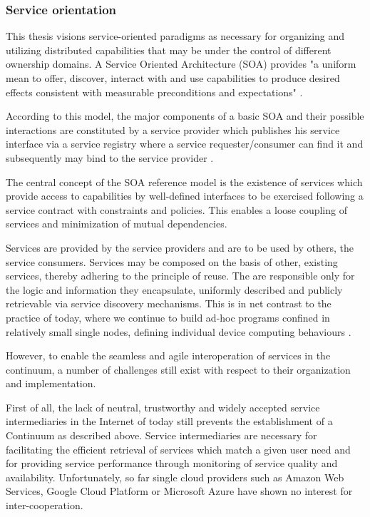 \documentclass{ieeeaccess}
\begin{document}
\subsubsection{Service orientation}

This thesis visions service-oriented paradigms as necessary for organizing and utilizing distributed capabilities that may be under the control of different ownership domains. A Service Oriented Architecture (SOA) provides "a uniform mean to offer, discover, interact with and use capabilities to produce desired effects consistent with measurable preconditions and expectations" \cite{oasis}.

According to this model, the major components of a basic SOA and their possible interactions are constituted by a service provider which publishes his service interface via a service registry where a service requester/consumer can find it and subsequently may bind to the service provider \cite{iot-enterprise}.

The central concept of the SOA reference model is the existence of services which provide access to capabilities by well-defined interfaces to be exercised following a service contract with constraints and policies. This enables a loose coupling of services and minimization of mutual dependencies.

Services are provided by the service providers and are to be used by others, the service consumers. Services may be composed on the basis of other, existing services, thereby adhering to the principle of reuse. The are responsible only for the logic and information they encapsulate, uniformly described and publicly retrievable via service discovery mechanisms. This is in net contrast to the practice of today, where we continue to build ad-hoc programs confined in relatively small single nodes, defining individual device computing behaviours \cite{harnessing-continuum}.

However, to enable the seamless and agile interoperation of services in the continuum, a number of challenges still exist with respect to their organization and implementation.

First of all, the lack of neutral, trustworthy and widely accepted service intermediaries in the Internet of today still prevents the establishment of a Continuum as described above. Service intermediaries are necessary for facilitating the efficient retrieval of services which match a given user need and for providing service performance through monitoring of service quality and availability. Unfortunately, so far single cloud providers such as Amazon Web Services, Google Cloud Platform or Microsoft Azure have shown no interest for inter-cooperation.
\end{document}
